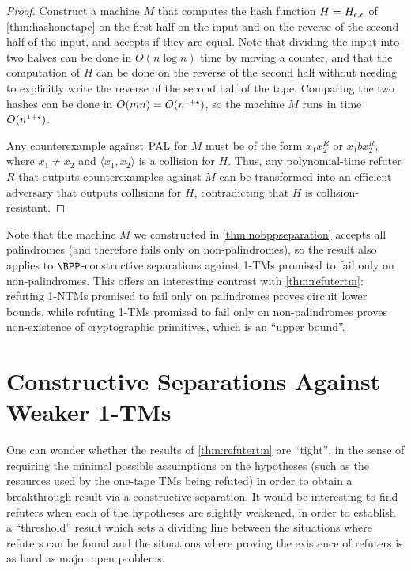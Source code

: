 \begin{proof}
Construct a machine $M$ that computes the hash function $H = H_{\epsilon, \epsilon}$ of \cref{thm:hashonetape} on the first
half on the input and on the reverse of the second half of the input, and accepts if they are equal. Note that dividing the 
input into two halves can be done in $O(n \log n)$ time by moving a counter, 
and that the computation of $H$ can be done on the reverse of
the second half without needing to explicitly write the reverse of the second half of the tape. Comparing the 
two hashes can be done in $O(mn) = O(n^{1+\epsilon})$, so the machine $M$ runs in time $O(n^{1+\epsilon})$. 

Any counterexample against $\mathrm{PAL}$ for $M$ must be of the form $x_1 x_2^R$ or $x_1 b x_2^R$,
where $x_1 \neq x_2$ and $\langle x_1, x_2 \rangle$ is a collision for $H$.
Thus, any polynomial-time refuter $R$ that outputs counterexamples against $M$ can be transformed into an 
efficient adversary that outputs collisions for $H$, contradicting that $H$ is collision-resistant. 
\end{proof}

Note that the machine $M$ we constructed in \cref{thm:nobppseparation} accepts all palindromes (and therefore fails only on non-palindromes), so
the result also applies to $\BPP$-constructive separations against 1-TMs promised to fail only on non-palindromes.
This offers an interesting contrast with \cref{thm:refutertm}: refuting 1-NTMs promised to fail only on palindromes proves
circuit lower bounds, while refuting 1-TMs promised to fail only on non-palindromes proves non-existence of cryptographic
primitives, which is an ``upper bound''.




\section{Constructive Separations Against Weaker 1-TMs}
\label{sec:refuteragainstweakertm}

One can wonder whether the results of \cref{thm:refutertm} are ``tight'', in the sense of requiring the minimal possible assumptions
on the hypotheses (such as the resources used by the one-tape TMs being refuted) in order to obtain a breakthrough result via a constructive
separation. It would be interesting to find refuters when each of the hypotheses are slightly weakened, in order to establish a ``threshold''
result which sets a dividing line between the situations where refuters can be found and the situations where proving the existence of
refuters is as hard as major open problems.

